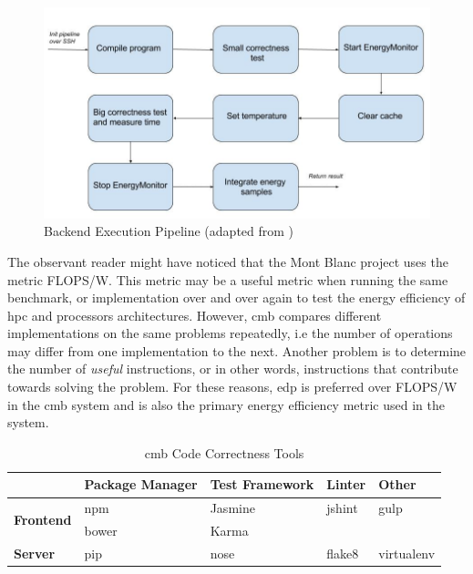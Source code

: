 \begin{figure}
  \includegraphics[width=1.0\textwidth]{figs/execution_pipeline.jpg}
  \caption[Backend Execution Pipeline]{Backend Execution Pipeline (adapted from \cite{mt:T&S})}
  \label{fig:execution-pipeline}
\end{figure}

The observant reader might have noticed that the Mont Blanc project uses the metric FLOPS/W. This metric may be a useful metric when running the same benchmark, or implementation over and over again to test the energy efficiency of \gls{hpc} and processors architectures. However, \gls{cmb} compares different implementations on the same problems repeatedly, i.e the number of operations may differ from one implementation to the next. Another problem is to determine the number of \textit{useful} instructions, or in other words, instructions that contribute towards solving the problem. For these reasons, \gls{edp} is preferred over FLOPS/W in the \gls{cmb} system and is also the primary energy efficiency metric used in the system.

\begin{table}[b!]
  \centering
  \begin{tabular}{ l|p{2.1cm}|p{2.2cm}|l|l }
    & \textbf{Package Manager} & \raggedright\textbf{Test Framework} & \textbf{Linter} & \textbf{Other} \\ \hline
  \multirow{2}{*}{\textbf{Frontend}} & npm \cite{NPM} & Jasmine \cite{JASMINE} & jshint \cite{JSHINT} & gulp \cite{GULP} \\
                                     & bower \cite{BOWER} & Karma \cite{KARMA} &  &  \\ \hline
  \multirow{1}{*}{\textbf{Server}} & pip \cite{PIP} & nose \cite{NOSE} & flake8 \cite{FLAKE8} & virtualenv \cite{VIRTUALENV}\\
  \end{tabular}
  \caption{\gls{cmb} Code Correctness Tools}
  \label{tab:cct}
\end{table}

